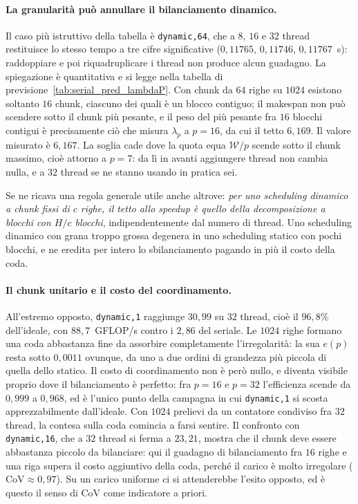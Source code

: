 \paragraph{La granularità può annullare il bilanciamento dinamico.}
Il caso più istruttivo della tabella è \texttt{dynamic,64}, che a $8$, $16$ e
$32$ thread restituisce lo stesso tempo a tre cifre significative
($0{,}11765$, $0{,}11746$, $0{,}11767$~s): raddoppiare e poi riquadruplicare i
thread non produce alcun guadagno. La spiegazione è quantitativa e si legge
nella tabella di previsione~\ref{tab:serial_pred_lambdaP}. Con chunk da $64$
righe su $1024$ esistono soltanto $16$ chunk, ciascuno dei quali è un blocco
contiguo; il makespan non può scendere sotto il chunk più pesante, e il peso del
più pesante fra $16$ blocchi contigui è precisamente ciò che misura $\lambda_p$
a $p=16$, da cui il tetto $6{,}169$. Il valore misurato è $6{,}167$. La soglia
cade dove la quota equa $\mathcal{W}/p$ scende sotto il chunk massimo, cioè
attorno a $p=7$: da lì in avanti aggiungere thread non cambia nulla, e a $32$
thread se ne stanno usando in pratica sei.

Se ne ricava una regola generale utile anche altrove: \emph{per uno scheduling
dinamico a chunk fissi di $c$ righe, il tetto allo speedup è quello della
decomposizione a blocchi con $H/c$ blocchi}, indipendentemente dal numero di
thread. Uno scheduling dinamico con grana troppo grossa degenera in uno
scheduling statico con pochi blocchi, e ne eredita per intero lo sbilanciamento
pagando in più il costo della coda.

\paragraph{Il chunk unitario e il costo del coordinamento.}
All'estremo opposto, \texttt{dynamic,1} raggiunge $30{,}99$ su $32$ thread, cioè
il $96{,}8\%$ dell'ideale, con $88{,}7$~GFLOP/s contro i $2{,}86$ del seriale.
Le $1024$ righe formano una coda abbastanza fine da assorbire completamente
l'irregolarità: la sua $e(p)$ resta sotto $0{,}0011$ ovunque, da uno a due
ordini di grandezza più piccola di quella dello statico. Il costo di coordinamento non è
però nullo, e diventa visibile proprio dove il bilanciamento è perfetto: fra
$p=16$ e $p=32$ l'efficienza scende da $0{,}999$ a $0{,}968$, ed è l'unico
punto della campagna in cui \texttt{dynamic,1} si scosta apprezzabilmente
dall'ideale. Con $1024$ prelievi da un contatore condiviso fra $32$ thread, la
contesa sulla coda comincia a farsi sentire. Il confronto con
\texttt{dynamic,16}, che a $32$ thread si ferma a $23{,}21$, mostra che il chunk
deve essere abbastanza piccolo da bilanciare: qui il guadagno di bilanciamento fra
$16$ righe e una riga supera il costo aggiuntivo della coda, perché il carico è
molto irregolare ($\mathrm{CoV} \approx 0{,}97$). Su un carico uniforme ci si
attenderebbe l'esito opposto, ed è questo il senso di $\mathrm{CoV}$ come
indicatore a priori.


